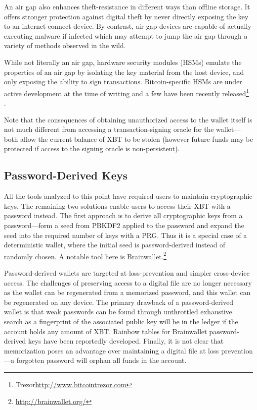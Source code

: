 An air gap also enhances theft-resistance in different ways than offline storage. It offers stronger protection against digital theft by never directly exposing the key to an internet-connect device. By contrast, air gap devices are capable of actually executing malware if infected which may attempt to jump the air gap through a variety of methods observed in the wild.

While not literally an air gap, hardware security modules (HSMs) emulate the properties of an air gap by isolating the key material from the host device, and only exposing the ability to sign transactions. Bitcoin-specific HSMs are under active development at the time of writing and a few have been recently released\footnote{Trezor\url{http://www.bitcointrezor.com}} .

Note that the consequences of obtaining unauthorized access to the wallet itself is not much different from accessing a transaction-signing oracle for the wallet---both allow the current balance of XBT to be stolen (however future funds may be protected if access to the signing oracle is non-persistent). 


\subsection{Password-Derived Keys} 

All the tools analyzed to this point have required users to maintain cryptographic keys. The remaining two solutions enable users to access their XBT with a password instead. The first approach is to derive all cryptographic keys from a password---\eg form a seed from PBKDF2 applied to the password and expand the seed into the required number of keys with a PRG. Thus it is a special case of a deterministic wallet, where the initial seed is password-derived instead of randomly chosen. A notable tool here is Brainwallet.\footnote{\url{http://brainwallet.org/}}

Password-derived wallets are targeted at loss-prevention and simpler cross-device access. The challenges of preserving access to a digital file are no longer necessary as the wallet can be regenerated from a memorized password, and this wallet can be regenerated on any device. The primary drawback of a password-derived wallet is that weak passwords can be found through unthrottled exhaustive search as a fingerprint of the associated public key will be in the ledger if the account holds any amount of XBT. Rainbow tables for Brainwallet password-derived keys have been reportedly developed. Finally, it is not clear that memorization poses an advantage over maintaining a digital file at loss prevention---a forgotten password will orphan all funds in the account.


